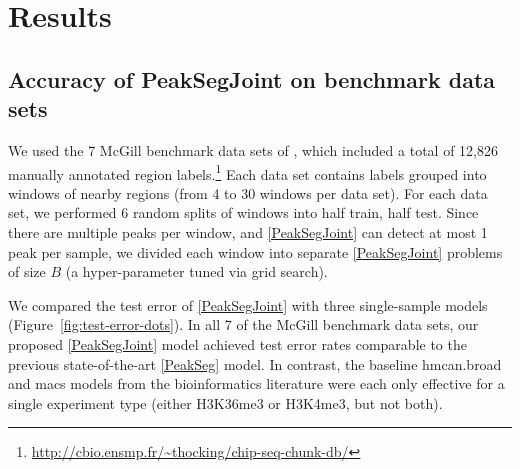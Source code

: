 \documentclass{article} %
\begin{document}

\section{Results}
\label{sec:results}

\subsection{Accuracy of PeakSegJoint on benchmark data sets}

We used the 7 McGill benchmark data sets of
\citet{hocking2014visual}, which included a total of 12,826 manually
annotated
region labels.\footnote{\url{http://cbio.ensmp.fr/~thocking/chip-seq-chunk-db/}}
Each data set contains labels grouped into windows of nearby regions
(from 4 to 30 windows per data set). For each data set, we performed 6
random splits of windows into half train, half test. Since there are
multiple peaks per window, and \ref{PeakSegJoint} can detect at most 1
peak per sample, we divided each window into separate
\ref{PeakSegJoint} problems of size $B$ (a hyper-parameter tuned via
grid search).

We compared the test error of \ref{PeakSegJoint} with three
single-sample models (Figure~\ref{fig:test-error-dots}). In all 7 of
the McGill benchmark data sets, our proposed \ref{PeakSegJoint} model
achieved test error rates comparable to the previous state-of-the-art
\ref{PeakSeg} model. In contrast, the baseline hmcan.broad
\citep{HMCan} and macs \citep{MACS} models from the bioinformatics
literature were each only effective for a single experiment type
(either H3K36me3 or H3K4me3, but not both).

\end{document}
